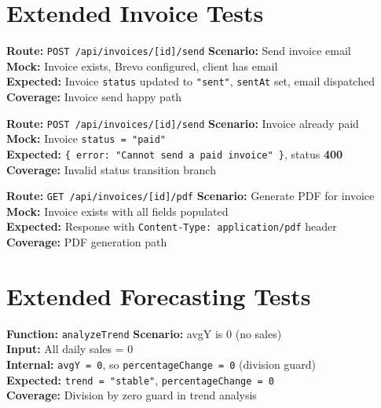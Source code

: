 \documentclass[12pt,a4paper]{report}
\newcommand{\ptwo}{\textbf{\color{p2orange}P2}}
\begin{document}
\section{Extended Invoice Tests}

\begin{tcolorbox}[testbox,title={INV-016 \hfill \ptwo}]
\textbf{Route:} \texttt{POST /api/invoices/[id]/send} \quad \textbf{Scenario:} Send invoice email \\
\textbf{Mock:} Invoice exists, Brevo configured, client has email \\
\textbf{Expected:} Invoice \texttt{status} updated to \texttt{"sent"}, \texttt{sentAt} set, email dispatched \\
\textbf{Coverage:} Invoice send happy path
\end{tcolorbox}

\begin{tcolorbox}[testbox,title={INV-017 \hfill \ptwo}]
\textbf{Route:} \texttt{POST /api/invoices/[id]/send} \quad \textbf{Scenario:} Invoice already paid \\
\textbf{Mock:} Invoice \texttt{status = "paid"} \\
\textbf{Expected:} \texttt{\{ error: "Cannot send a paid invoice" \}}, status \textbf{400} \\
\textbf{Coverage:} Invalid status transition branch
\end{tcolorbox}

\begin{tcolorbox}[testbox,title={INV-018 \hfill \ptwo}]
\textbf{Route:} \texttt{GET /api/invoices/[id]/pdf} \quad \textbf{Scenario:} Generate PDF for invoice \\
\textbf{Mock:} Invoice exists with all fields populated \\
\textbf{Expected:} Response with \texttt{Content-Type: application/pdf} header \\
\textbf{Coverage:} PDF generation path
\end{tcolorbox}

\section{Extended Forecasting Tests}

\begin{tcolorbox}[testbox,title={FORE-016 \hfill \ptwo}]
\textbf{Function:} \texttt{analyzeTrend} \quad \textbf{Scenario:} avgY is 0 (no sales) \\
\textbf{Input:} All daily sales = 0 \\
\textbf{Internal:} \texttt{avgY = 0}, so \texttt{percentageChange = 0} (division guard) \\
\textbf{Expected:} \texttt{trend = "stable"}, \texttt{percentageChange = 0} \\
\textbf{Coverage:} Division by zero guard in trend analysis
\end{tcolorbox}
\end{document}
